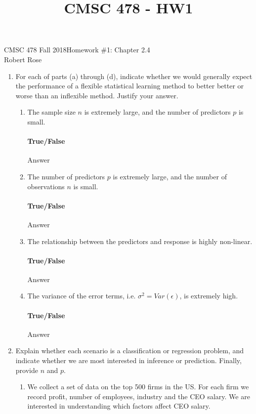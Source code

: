 \documentclass[12pt]{article}
\title{CMSC 478 - HW1}
\begin{document}
CMSC 478 Fall 2018\hfill Homework \#1: Chapter 2.4\\
Robert Rose

\hrulefill

\begin{enumerate}
\item For each of parts (a) through (d), indicate whether we would generally
      expect the performance of a flexible statistical learning method to better
      better or worse than an inflexible method. Justify your answer.
  \begin{enumerate}
  \item The sample size $n$ is extremely large, and the number of predictors
        $p$ is small.\\
  \vspace{-2.5em}
  \paragraph{True/False} Answer

  \item The number of predictors $p$ is extremely large, and the number of
        observations $n$ is small.\\
  \vspace{-2.5em}
  \paragraph{True/False} Answer

  \item The relationship between the predictors and response is highly non-linear.\\
  \vspace{-2.5em}
  \paragraph{True/False} Answer

  \item The variance of the error terms, i.e. $\sigma^2 = Var(\epsilon)$, is extremely high.\\
  \vspace{-2.5em}
  \paragraph{True/False} Answer
  \end{enumerate}
\newpage

\item Explain whether each scenario is a classification or regression problem,
      and indicate whether we are most interested in inference or prediction.
      Finally, provide $n$ and $p$.
  \begin{enumerate}
    \item We collect a set of data on the top 500 firms in the US. For each firm
          we record profit, number of employees, industry and the CEO salary. We
          are interested in understanding which factors affect CEO salary.\\
    \vspace{-2.5em}

\end{enumerate}
\end{enumerate}
\end{document}

